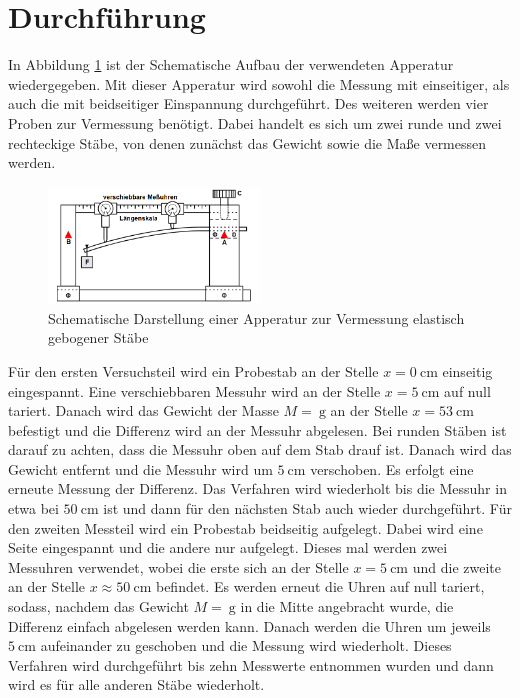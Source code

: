 \section{Durchführung}
\label{sec:Durchführung}
In Abbildung \ref{fig:aufbau} ist der Schematische Aufbau der verwendeten Apperatur wiedergegeben. 
Mit dieser Apperatur wird sowohl die Messung mit einseitiger, als auch die mit beidseitiger Einspannung durchgeführt.
Des weiteren werden vier Proben zur Vermessung benötigt. Dabei handelt es sich um zwei runde und zwei rechteckige Stäbe, von denen zunächst das Gewicht sowie die Maße vermessen werden.
\begin{figure}
    \centering
    \caption{Schematische Darstellung einer Apperatur zur Vermessung elastisch gebogener Stäbe \cite{v103}}
    \label{fig:aufbau}
    \includegraphics[width=0.5\textwidth]{pics/aufbau.png}
\end{figure}
Für den ersten Versuchsteil wird ein Probestab an der Stelle $x=\SI{0}{\centi\metre}$ einseitig eingespannt. Eine verschiebbaren Messuhr wird an der Stelle $x=\SI{5}{\centi\metre}$ auf null tariert. Danach wird das Gewicht der Masse $M=\SI{}{\gram}$ an der
Stelle $x=\SI{53}{\centi\metre}$ befestigt und die Differenz wird an der Messuhr abgelesen. Bei runden Stäben ist darauf zu achten, dass die Messuhr oben auf dem Stab drauf ist.
Danach wird das Gewicht entfernt und die Messuhr wird um $\SI{5}{\centi\metre}$ verschoben. Es erfolgt eine erneute Messung der Differenz. Das Verfahren wird wiederholt bis die Messuhr in etwa bei 
$\SI{50}{\centi\metre}$ ist und dann für den nächsten Stab auch wieder durchgeführt.
Für den zweiten Messteil wird ein Probestab beidseitig aufgelegt. Dabei wird eine Seite eingespannt und die andere nur aufgelegt. Dieses mal werden zwei Messuhren verwendet, wobei die erste sich an der Stelle $x=\SI{5}{\centi\metre}$ und die zweite an der Stelle
$x \approx \SI{50}{\centi\metre}$ befindet. Es werden erneut die Uhren auf null tariert, sodass, nachdem das Gewicht $M=\SI{}{\gram}$ in die Mitte angebracht wurde, die Differenz einfach abgelesen werden kann.
Danach werden die Uhren um jeweils $\SI{5}{\centi\metre}$ aufeinander zu geschoben und die Messung wird wiederholt. Dieses Verfahren wird durchgeführt bis zehn Messwerte entnommen wurden und dann wird es für alle anderen Stäbe wiederholt.